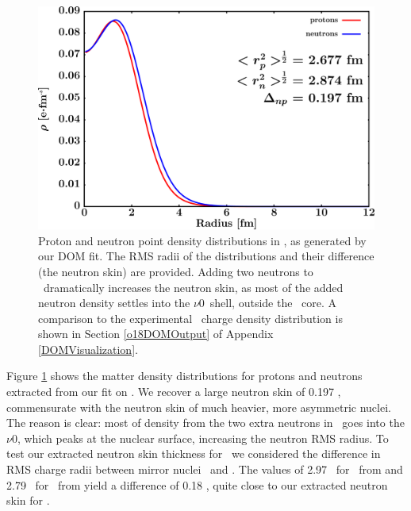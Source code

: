 \begin{figure}[tb]
    \centering
    \includegraphics[width=\textwidth]{figures/o18_matterDensity.png}
    \caption[Proton and neutron matter density distributions in \oEight]
    {
        Proton and neutron point density distributions in \oEight, as
        generated by our DOM fit. The RMS radii of the distributions and their
        difference (the neutron skin) are provided. Adding two neutrons to \oSix\ dramatically
        increases the neutron skin, as most of the added neutron density settles into
        the $\nu$0\dFive\ shell, outside the \oSix\ core. A comparison to the
        experimental \oEight\ charge density distribution is shown in Section
        \ref{o18DOMOutput} of Appendix \ref{DOMVisualization}.
    }
    \label{O18MatterDistribution}
\end{figure}

Figure \ref{O18MatterDistribution} shows the matter density distributions for protons
and neutrons extracted from our fit on \oEight. We recover a large neutron skin of
0.197 \femto\meter, commensurate with the neutron skin of much heavier,
more asymmetric nuclei. The reason is clear: most
of density from the two extra neutrons in \oEight\ goes into the
$\nu$0\dFive, which peaks at the nuclear surface, increasing the neutron RMS
radius. To test our extracted neutron skin thickness for \oEight\, we considered 
the difference in RMS charge radii between mirror nuclei \neEight\ and \oEight.
The values of 2.97 \femto\meter\ for \neEight\ from \cite{Marinova2011} and
2.79 \femto\meter\ for \oEight\ from \cite{DeVries1987, Brown1979}
yield a difference of 0.18
\femto\meter, quite close to our extracted neutron skin for \oEight.

